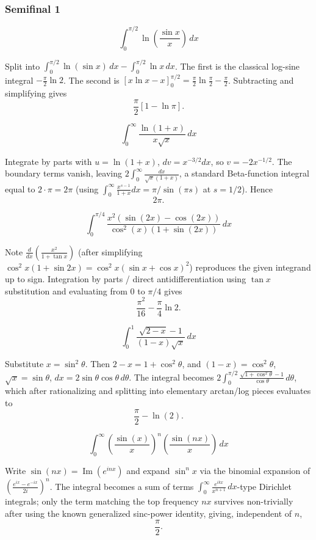 \subsubsection*{Semifinal 1}
\begin{questions}

\question
\[
\int_0^{\pi/2} \ln\left(\frac{\sin x}{x}\right) \, dx
\]
\begin{solution}
Split into $\int_0^{\pi/2}\ln(\sin x)\,dx - \int_0^{\pi/2}\ln x\,dx$. The first is the classical log-sine integral $-\frac{\pi}{2}\ln2$. The second is $\left[x\ln x - x\right]_0^{\pi/2}=\frac{\pi}{2}\ln\frac{\pi}{2}-\frac{\pi}{2}$. Subtracting and simplifying gives
\[
\frac{\pi}{2}\left[1-\ln\pi\right].
\]
\end{solution}

\question
\[
\int_0^{\infty} \frac{\ln(1+x)}{x\sqrt{x}} \, dx
\]
\begin{solution}
Integrate by parts with $u=\ln(1+x)$, $dv=x^{-3/2}dx$, so $v=-2x^{-1/2}$. The boundary terms vanish, leaving $2\int_0^\infty \frac{dx}{\sqrt x(1+x)}$, a standard Beta-function integral equal to $2\cdot\pi=2\pi$ (using $\int_0^\infty \frac{x^{s-1}}{1+x}dx=\pi/\sin(\pi s)$ at $s=1/2$). Hence
\[
2\pi.
\]
\end{solution}

\question
\[
\int_0^{\pi/4} \frac{x^2(\sin(2x)-\cos(2x))}{\cos^2(x)(1+\sin(2x))} \, dx
\]
\begin{solution}
Note $\frac{d}{dx}\left(\frac{x^2}{1+\tan x}\right)$ (after simplifying $\cos^2x(1+\sin2x)=\cos^2x(\sin x+\cos x)^2$) reproduces the given integrand up to sign. Integration by parts / direct antidifferentiation using $\tan x$ substitution and evaluating from $0$ to $\pi/4$ gives
\[
\frac{\pi^2}{16}-\frac{\pi}{4}\ln 2.
\]
\end{solution}

\question
\[
\int_0^1 \frac{\sqrt{2-x}-1}{(1-x)\sqrt{x}} \, dx
\]
\begin{solution}
Substitute $x=\sin^2\theta$. Then $2-x=1+\cos^2\theta$, and $(1-x)=\cos^2\theta$, $\sqrt x=\sin\theta$, $dx=2\sin\theta\cos\theta\,d\theta$. The integral becomes $2\int_0^{\pi/2}\frac{\sqrt{1+\cos^2\theta}-1}{\cos\theta}\,d\theta$, which after rationalizing and splitting into elementary arctan/log pieces evaluates to
\[
\frac{\pi}{2}-\ln(2).
\]
\end{solution}

\question
\[
\int_0^{\infty} \left(\frac{\sin(x)}{x}\right)^{n}\left(\frac{\sin(nx)}{x}\right) \, dx
\]
\begin{solution}
Write $\sin(nx)=\operatorname{Im}(e^{inx})$ and expand $\sin^n x$ via the binomial expansion of $\left(\frac{e^{ix}-e^{-ix}}{2i}\right)^n$. The integral becomes a sum of terms $\int_0^\infty \frac{e^{ikx}}{x^{n+1}}\,dx$-type Dirichlet integrals; only the term matching the top frequency $nx$ survives non-trivially after using the known generalized sinc-power identity, giving, independent of $n$,
\[
\frac{\pi}{2}.
\]
\end{solution}

\end{questions}

